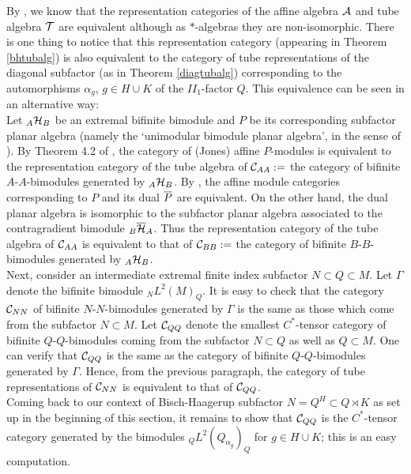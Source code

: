 \begin{rem}
By \cite[Theorem 4.2]{GJ}, we know that the representation categories of the  affine algebra $ \mathcal A $ and tube algebra $ \mathcal T $ are equivalent although as $ * $-algebras they are non-isomorphic.
There is one thing to notice that this representation category (appearing in Theorem \ref{bhtubalg}) is also equivalent to the category of tube representations of the diagonal subfactor (as in Theorem \ref{diagtubalg}) corresponding to the automorphisms $\alpha_g$, $g\in H\cup K$ of the $ II_1 $-factor $ Q $.
This equivalence can be seen in an alternative way:\\
\indent Let $_A \mathcal H_B $ be an extremal bifinite bimodule and $ P $ be its corresponding subfactor planar algebra (namely the `unimodular bimodule planar algebra', in the sense of \cite{pertpa}).
By Theorem 4.2 of \cite{GJ}, the category of (Jones) affine $ P $-modules is equivalent to the representation category of the tube algebra of $ \mathcal C_{AA}:= $ the category of bifinite $ A $-$ A $-bimodules generated by $_A \mathcal H_B $.
By \cite[Remark 2.16]{DGG1}, the affine module categories corresponding to $ P $ and its dual $ \overline{P} $ are equivalent.
On the other hand, the dual planar algebra is isomorphic to the subfactor planar algebra associated to the contragradient bimodule $_B \overline{\mathcal H}_A $.
Thus the representation category of the tube algebra of $ \mathcal C_{AA} $ is equivalent to that of $ \mathcal C_{BB}:= $ the category of bifinite $ B $-$ B $-bimodules generated by $_A \mathcal H_B $.\\
\indent Next, consider an intermediate extremal finite index subfactor $ N \subset Q \subset M $.
Let $ \Gamma $ denote the bifinite bimodule $_N L^2 (M)_Q  $.
It is easy to check that the category $ \mathcal C_{NN} $ of bifinite $ N $-$ N $-bimodules generated by $ \Gamma $ is the same as those which come from the subfactor $ N \subset M $.
Let $ \mathcal C_{QQ} $ denote the smallest $ C^* $-tensor category of bifinite $ Q $-$Q $-bimodules coming from the subfactor $ N \subset Q $ as well as $ Q \subset M $.
One can verify that $ \mathcal C_{QQ} $ is the same as the category of bifinite $ Q $-$Q $-bimodules generated by $ \Gamma $.
Hence, from the previous paragraph, the category of tube representations of $ \mathcal C_{NN} $ is equivalent to that of $ \mathcal C_{QQ} $.\\
\indent Coming back to our context of Bisch-Haagerup subfactor $ N = Q^H \subset Q \rtimes K $ as set up in the beginning of this section, it remains to show that $ \mathcal C_{QQ} $ is the $ C^* $-tensor category generated by the bimodules $_Q L^2 (Q_{\alpha_g})_Q $ for $ g \in H \cup K $; this is an easy computation.
\end{rem}